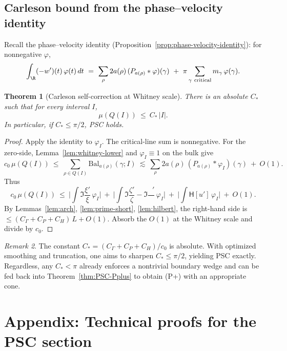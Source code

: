 \documentclass[11pt]{article}
\newtheorem{theorem}{Theorem}
\theoremstyle{remark}
\newtheorem{remark}[theorem]{Remark}
\DeclareMathOperator{\dettwo}{det_2}
\begin{document}
\subsection{Carleson bound from the phase--velocity identity}
Recall the phase--velocity identity (Proposition~\ref{prop:phase-velocity-identity}): for nonnegative \(\varphi\),
\[ \int_{\R}(-w')(t)\,\varphi(t)\,dt\ =\ \sum_{\rho}2a(\rho)\,(P_{a(\rho)}*\varphi)(\gamma)\ +\ \pi\sum_{\gamma\ \mathrm{critical}} m_\gamma\,\varphi(\gamma).\]

\begin{theorem}[Carleson self-correction at Whitney scale]\label{thm:psc-unconditional}
There is an absolute \(C_*\) such that for every interval \(I\),
\[ \mu(Q(I))\ \le\ C_*\,|I|. \]
In particular, if \(C_*\le \pi/2\), PSC holds.
\end{theorem}
\begin{proof}
Apply the identity to \(\varphi_I\). The critical-line sum is nonnegative. For the zero-side, Lemma~\ref{lem:whitney-lower} and \(\varphi_I\equiv 1\) on the bulk give
\[ c_0\,\mu(Q(I))\ \le\ \sum_{\rho\in Q(I)} \mathrm{Bal}_{a(\rho)}(\gamma;I)\ \lesssim\ \sum_{\rho}2a(\rho)\,(P_{a(\rho)}*\varphi_I)(\gamma)\ +\ O(1). \]
Thus
\[ c_0\,\mu(Q(I))\ \le\ \Big|\int \Im\frac{\xi'}{\xi}\,\varphi_I\Big|\ +\ \Big|\int \Im\frac{\zeta'}{\zeta}-\Im\frac{\dettwo'}{\dettwo}\,\varphi_I\Big|\ +\ \Big|\int \mathsf H[u']\,\varphi_I\Big|\ +\ O(1). \]
By Lemmas~\ref{lem:arch}, \ref{lem:prime-short}, \ref{lem:hilbert}, the right-hand side is \(\le (C_\Gamma+C_P+C_H)\,L+O(1)\). Absorb the \(O(1)\) at the Whitney scale and divide by \(c_0\).
\end{proof}

\begin{remark}
The constant \(C_*=(C_\Gamma+C_P+C_H)/c_0\) is absolute. With optimized smoothing and truncation, one aims to sharpen \(C_*\le \pi/2\), yielding PSC exactly. Regardless, any \(C_*<\pi\) already enforces a nontrivial boundary wedge and can be fed back into Theorem~\ref{thm:PSC-Pplus} to obtain (P+) with an appropriate cone.
\end{remark}

\appendix
\section{Appendix: Technical proofs for the PSC section}\label{app:psc-tech}
\end{document}

